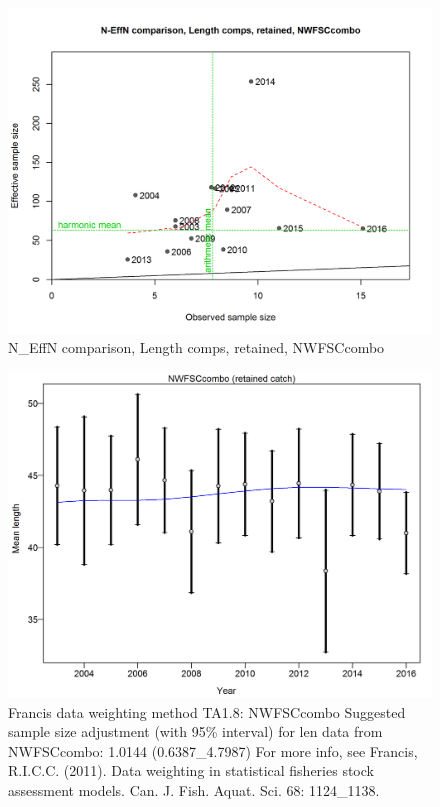 \documentclass[12pt,]{article}
\begin{document}
\begin{figure}[htbp]
\centering
\includegraphics{./r4ss/plots_mod1/comp_lenfit_sampsize_flt6mkt2.png}
\caption{N\_EffN comparison, Length comps, retained, NWFSCcombo
\label{fig:mod1_28_comp_lenfit_sampsize_flt6mkt2}}
\end{figure}

\begin{figure}[htbp]
\centering
\includegraphics{./r4ss/plots_mod1/comp_lenfit_data_weighting_TA1.8_NWFSCcombo.png}
\caption{Francis data weighting method TA1.8: NWFSCcombo Suggested
sample size adjustment (with 95\% interval) for len data from
NWFSCcombo: 1.0144 (0.6387\_4.7987) For more info, see Francis, R.I.C.C.
(2011). Data weighting in statistical fisheries stock assessment models.
Can. J. Fish. Aquat. Sci. 68: 1124\_1138.
\label{fig:mod1_29_comp_lenfit_data_weighting_TA1.8_NWFSCcombo}}
\end{figure}
\end{document}
